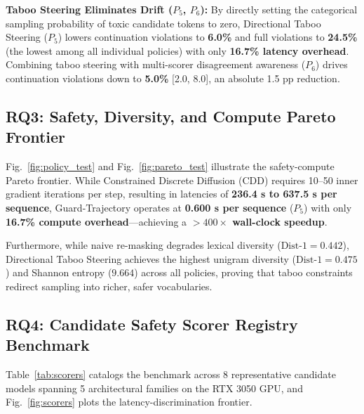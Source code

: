 \documentclass[conference]{IEEEtran}
\begin{document}
\textbf{Taboo Steering Eliminates Drift ($P_5$, $P_6$):} By directly setting the categorical sampling probability of toxic candidate tokens to zero, Directional Taboo Steering ($P_5$) lowers continuation violations to \textbf{6.0\%} and full violations to \textbf{24.5\%} (the lowest among all individual policies) with only \textbf{16.7\% latency overhead}. Combining taboo steering with multi-scorer disagreement awareness ($P_6$) drives continuation violations down to \textbf{5.0\%} [2.0, 8.0], an absolute 1.5 pp reduction.

\subsection{RQ3: Safety, Diversity, and Compute Pareto Frontier}
Fig.~\ref{fig:policy_test} and Fig.~\ref{fig:pareto_test} illustrate the safety-compute Pareto frontier. While Constrained Discrete Diffusion (CDD) \cite{cardei2025cdd} requires 10--50 inner gradient iterations per step, resulting in latencies of \textbf{236.4 s to 637.5 s per sequence}, Guard-Trajectory operates at \textbf{0.600 s per sequence} ($P_5$) with only \textbf{16.7\% compute overhead}---achieving a \textbf{$>400\times$ wall-clock speedup}.

Furthermore, while naive re-masking degrades lexical diversity ($\text{Dist-1}=0.442$), Directional Taboo Steering achieves the highest unigram diversity ($\text{Dist-1}=0.475$) and Shannon entropy ($9.664$) across all policies, proving that taboo constraints redirect sampling into richer, safer vocabularies.

\subsection{RQ4: Candidate Safety Scorer Registry Benchmark}
Table~\ref{tab:scorers} catalogs the benchmark across 8 representative candidate models spanning 5 architectural families on the RTX 3050 GPU, and Fig.~\ref{fig:scorers} plots the latency-discrimination frontier.
\end{document}
